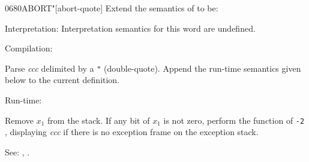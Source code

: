 \begin{newword}[ABORTq]{0680}{ABORT"}[abort-quote]
	Extend the semantics of  to be:

\item[Interpretation:]
	Interpretation semantics for this word are undefined.

\item[Compilation:]

	Parse \emph{ccc} delimited by a \texttt{"} (double-quote).
	Append the run-time semantics given below to the current
	definition.

\item[Run-time:]

	Remove $x_1$ from the stack. If any bit of $x_1$ is not zero,
	perform the function of \texttt{-2} , displaying
	\emph{ccc} if there is no exception frame on the exception
	stack.

\item[See:]
	,
	.
\end{newword}
